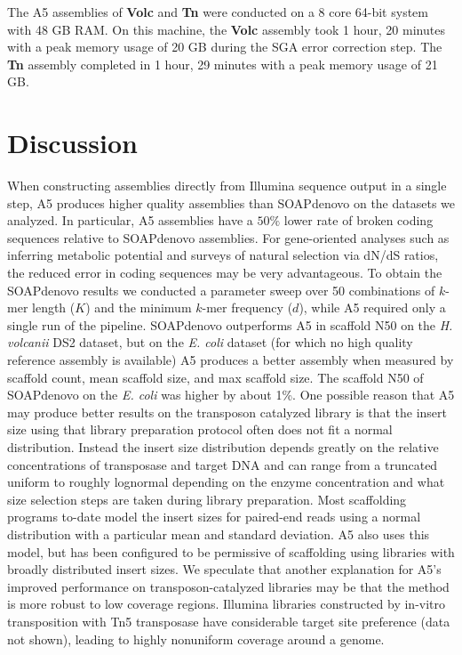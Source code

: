 \documentclass[10pt]{article}
\begin{document}
The A5 assemblies of \textbf{Volc} and \textbf{Tn} were conducted on a 8 core 64-bit system with 48 GB RAM. On this machine, the \textbf{Volc} assembly took 1 hour, 20 minutes with a peak memory usage of 20 GB during the SGA error correction step. The \textbf{Tn} assembly completed in 1 hour, 29 minutes with a peak memory usage of 21 GB.

\section*{Discussion}

When constructing assemblies directly from Illumina sequence output in a single step, A5 produces higher quality assemblies 
than SOAPdenovo on the datasets we analyzed. 
In particular, A5 assemblies have a $50\%$ lower rate of broken coding sequences relative to SOAPdenovo assemblies.
For gene-oriented analyses such as inferring metabolic potential and surveys of natural selection via dN/dS ratios, the reduced error in coding sequences may be very advantageous.
 To obtain the SOAPdenovo results we conducted a parameter sweep 
over 50 combinations of $k$-mer length ($K$) and the minimum $k$-mer frequency ($d$), while A5 required
only a single run of the pipeline.
SOAPdenovo outperforms A5 in scaffold N50 on the \textit{H. volcanii} DS2 dataset, but on the \textit{E. coli} dataset 
(for which no high quality reference assembly is available) 
A5 produces a better assembly when measured by scaffold count, mean scaffold size, and max scaffold size. The scaffold N50 of 
SOAPdenovo on the \textit{E. coli} was higher by about 1\%.
One possible reason that A5 may produce better results on the transposon catalyzed library is that the insert size using
that library preparation protocol often does not fit a normal distribution.  Instead the insert size 
distribution depends greatly on the relative concentrations of transposase and target DNA and can range from a truncated uniform
to roughly lognormal depending on the enzyme concentration and what size selection steps are taken during library preparation.
Most scaffolding programs to-date model the insert sizes for paired-end reads using a normal distribution with a particular
mean and standard deviation. A5 also uses this model, but has been configured to be permissive of scaffolding
using libraries with broadly distributed insert sizes.  We speculate that another explanation for A5's improved performance on transposon-catalyzed 
libraries may be that the method is more robust to low coverage regions.  Illumina libraries constructed by in-vitro 
transposition with Tn5 transposase have considerable target site preference (data not shown), leading to highly nonuniform coverage around a genome.
\end{document}
